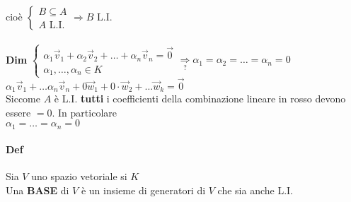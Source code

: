 \begin{enumerate}
        cioè 
        $
            \begin{cases}
                B\subseteq A\\
                A \textrm{ L.I.}
            \end{cases}
            \Longrightarrow
            B\textrm{ L.I.}
        $\\\\
        \color{red}
        \textbf{Dim}
        $
        \begin{cases}
            \alpha_1\vec{v}_1+\alpha_2\vec{v}_2+\dots+\alpha_n\vec{v}_n=\vec{0}\\
            \alpha_1,\dots,\alpha_n\in K
        \end{cases}
        \underset{?}{\Longrightarrow} \alpha_1=\alpha_2=\dots =\alpha_n=0
        $\\
        \color{black}
        $\alpha_1\vec{v}_1+\dots\alpha_n\vec{v}_n+0\vec{w}_1+0\cdot\vec{w}_2+
        \dots\vec{w}_k=\vec{0}$\\
        Siccome $A$ è L.I. \textbf{tutti} i coefficienti della combinazione lineare
        in rosso devono essere $=0$. In particolare \\
        $\alpha_1=\dots=\alpha_n=0$
\end{enumerate}

\paragraph{Def} Sia $V$ uno spazio vetoriale si $K$\\
Una \textbf{BASE} di $V$ è un insieme di generatori di $V$ che sia anche L.I. 
